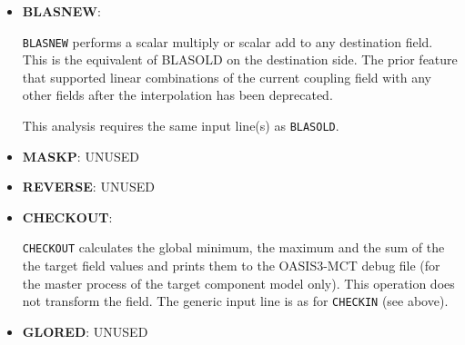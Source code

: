 \begin{itemize}
%
%

\item {\bf BLASNEW}:
 
{\tt BLASNEW} performs a scalar
multiply or scalar add to any destination field.  This is the equivalent
of BLASOLD on the destination side.  The prior feature that supported
linear combinations of the
current coupling field with any other fields after the
interpolation has been deprecated.

This analysis requires the same input line(s) as {\tt BLASOLD}.

\item {\bf MASKP}: UNUSED

\item {\bf REVERSE}: UNUSED

\item {\bf CHECKOUT}: 

{\tt CHECKOUT} calculates the global minimum, the maximum and the sum of the
 the target field values and prints them to the OASIS3-MCT debug file (for the master process of the target component model only). This operation does not transform the field. 
The generic input line is as for {\tt CHECKIN} (see above).

\item {\bf GLORED}: UNUSED

\end{itemize}


